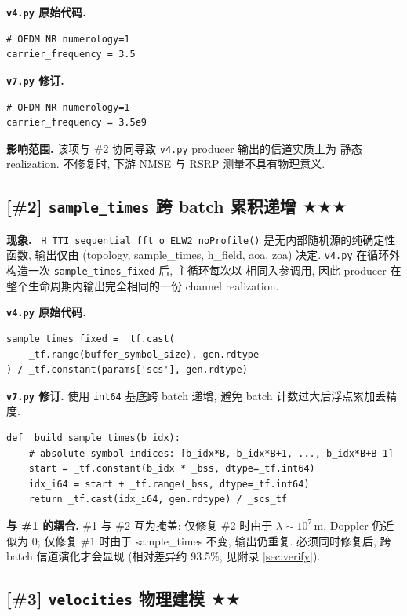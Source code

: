 \documentclass[11pt,a4paper,UTF8,fontset=fandol]{ctexart}
\newcommand{\stwo}{\textcolor{starcolor}{$\bigstar\bigstar$}}
\newcommand{\sthree}{\textcolor{starcolor}{$\bigstar\bigstar\bigstar$}}
\newcommand{\vfour}{\texttt{v4.py}}
\newcommand{\vseven}{\texttt{v7.py}}
\newcommand{\bugitem}[3]{%
  \subsection{[\##1] #2 \hfill #3}%
  \vspace{-0.5em}%
}
\begin{document}
\textbf{\vfour{} 原始代码.}
\begin{lstlisting}[caption={v4.py: line 194}]
# OFDM NR numerology=1
carrier_frequency = 3.5
\end{lstlisting}

\textbf{\vseven{} 修订.}
\begin{lstlisting}[caption={v7.py: line 234}]
# OFDM NR numerology=1
carrier_frequency = 3.5e9
\end{lstlisting}

\textbf{影响范围.} 该项与 \#2 协同导致 \vfour{} producer 输出的信道实质上为
静态 realization. 不修复时, 下游 NMSE 与 RSRP 测量不具有物理意义.

\bugitem{2}{\texttt{sample\_times} 跨 batch 累积递增}{\sthree}

\textbf{现象.} \texttt{\_H\_TTI\_sequential\_fft\_o\_ELW2\_noProfile()}
是无内部随机源的纯确定性函数, 输出仅由 (topology, sample\_times, h\_field, aoa, zoa)
决定. \vfour{} 在循环外构造一次 \texttt{sample\_times\_fixed} 后, 主循环每次以
相同入参调用, 因此 producer 在整个生命周期内输出完全相同的一份 channel realization.

\textbf{\vfour{} 原始代码.}
\begin{lstlisting}[caption={v4.py: lines 1817--1819 (定义于循环外, 循环内不变)}]
sample_times_fixed = _tf.cast(
    _tf.range(buffer_symbol_size), gen.rdtype
) / _tf.constant(params['scs'], gen.rdtype)
\end{lstlisting}

\textbf{\vseven{} 修订.} 使用 \texttt{int64} 基底跨 batch 递增,
避免 batch 计数过大后浮点累加丢精度.
\begin{lstlisting}[caption={v7.py: lines 2088--2092}]
def _build_sample_times(b_idx):
    # absolute symbol indices: [b_idx*B, b_idx*B+1, ..., b_idx*B+B-1]
    start = _tf.constant(b_idx * _bss, dtype=_tf.int64)
    idx_i64 = start + _tf.range(_bss, dtype=_tf.int64)
    return _tf.cast(idx_i64, gen.rdtype) / _scs_tf
\end{lstlisting}

\textbf{与 \#1 的耦合.} \#1 与 \#2 互为掩盖: 仅修复 \#2 时由于
$\lambda \sim 10^{7}\,\text{m}$, Doppler 仍近似为 0; 仅修复 \#1 时由于
sample\_times 不变, 输出仍重复. 必须同时修复后,
跨 batch 信道演化才会显现 (相对差异约 93.5\%, 见附录 \ref{sec:verify}).

\bugitem{3}{\texttt{velocities} 物理建模}{\stwo}
\end{document}

